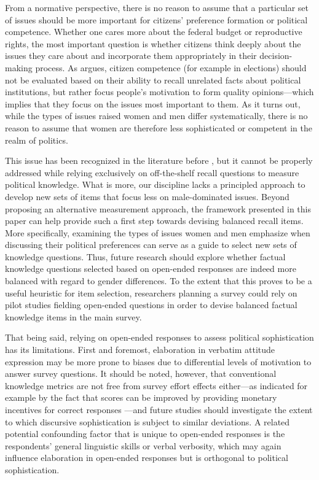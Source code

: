 From a normative perspective, there is no reason to assume that a particular set of issues should be more important for citizens' preference formation or political competence. Whether one cares more about the federal budget or reproductive rights, the most important question is whether citizens think deeply about the issues they care about and incorporate them appropriately in their decision-making process. As \citet{druckman2014pathologies} argues, citizen competence (for example in elections) should not be evaluated based on their ability to recall unrelated facts about political institutions, but rather focus people's motivation to form quality opinions---which implies that they focus on the issues most important to them. As it turns out, while the types of issues raised women and men differ systematically, there is no reason to assume that women are therefore less sophisticated or competent in the realm of politics.

This issue has been recognized in the literature before \citep[e.g.,][]{graber2001processing,dolan2011women,ferrin2020gender}, but it cannot be properly addressed while relying exclusively on off-the-shelf recall questions to measure political knowledge. What is more, our discipline lacks a principled approach to develop new sets of items that focus less on male-dominated issues. Beyond proposing an alternative measurement approach, the framework presented in this paper can help provide such a first step towards devising balanced recall items. More specifically, examining the types of issues women and men emphasize when discussing their political preferences can serve as a guide to select new sets of knowledge questions. Thus, future research should explore whether factual knowledge questions selected based on open-ended responses are indeed more balanced with regard to gender differences. To the extent that this proves to be a useful heuristic for item selection, researchers planning a survey could rely on pilot studies fielding open-ended questions in order to devise balanced factual knowledge items in the main survey.

That being said, relying on open-ended responses to assess political sophistication has its limitations. First and foremost, elaboration in verbatim attitude expression may be more prone to biases due to differential levels of motivation to answer survey questions. It should be noted, however, that conventional knowledge metrics are not free from survey effort effects either---as indicated for example by the fact that scores can be improved by providing monetary incentives for correct responses \citep{prior2008money}---and future studies should investigate the extent to which discursive sophistication is subject to similar deviations. A related potential confounding factor that is unique to open-ended responses is the respondents' general linguistic skills or verbal verbosity, which may again influence elaboration in open-ended responses but is orthogonal to political sophistication.

